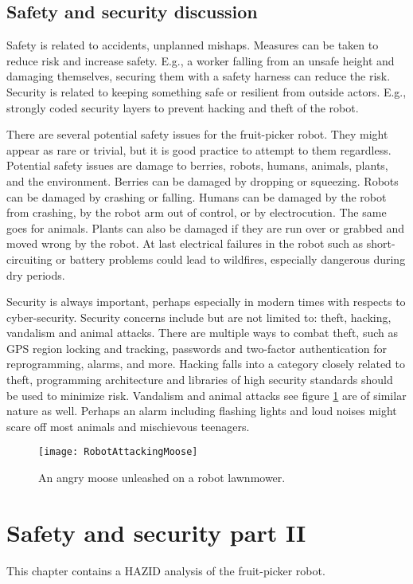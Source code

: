 \documentclass[%
oneside,    %
project,    %
nosummary   %
]{USN-MSc}
\begin{document}
\section{Safety and security discussion}

Safety is related to accidents, unplanned mishaps. Measures can be taken to reduce risk and increase safety. E.g., a worker falling from an unsafe height and damaging themselves, securing them with a safety harness can reduce the risk.
Security is related to keeping something safe or resilient from outside actors. E.g., strongly coded security layers to prevent hacking and theft of the robot.

There are several potential safety issues for the fruit-picker robot. They might appear as rare or trivial, but it is good practice to attempt to them regardless.
Potential safety issues are damage to berries, robots, humans, animals, plants, and the environment. Berries can be damaged by dropping or squeezing. Robots can be damaged by crashing or falling. Humans can be damaged by the robot from crashing, by the robot arm out of control, or by electrocution. The same goes for animals. Plants can also be damaged if they are run over or grabbed and moved wrong by the robot. At last electrical failures in the robot such as short-circuiting or battery problems could lead to wildfires, especially dangerous during dry periods.

Security is always important, perhaps especially in modern times with respects to cyber-security. Security concerns include but are not limited to: theft, hacking, vandalism and animal attacks. There are multiple ways to combat theft, such as GPS region locking and tracking, passwords and two-factor authentication for reprogramming, alarms, and more. Hacking falls into a category closely related to theft, programming architecture and libraries of high security standards should be used to minimize risk. Vandalism and animal attacks see figure \ref{fig:anAngryMoose} are of similar nature as well. Perhaps an alarm including flashing lights and loud noises might scare off most animals and mischievous teenagers. 

\begin{figure}[!ht]
  \centering
  \texttt{[image: RobotAttackingMoose]}
  \caption{An angry moose unleashed on a robot lawnmower.}
  \label{fig:anAngryMoose}
\end{figure}

\chapter{Safety and security part II}
\label{ch:safety2}
This chapter contains a HAZID analysis of the fruit-picker robot.
\end{document}
